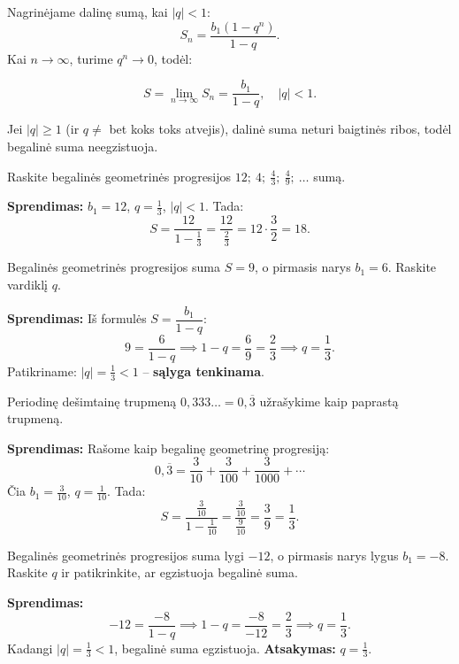 Nagrinėjame dalinę sumą, kai $|q| < 1$:
\[
    S_n = \frac{b_1(1 - q^n)}{1 - q}.
\]
Kai $n \to \infty$, turime $q^n \to 0$, todėl:

\begin{tcolorbox}[colback=orange!5!white, colframe=orange!70!black, title=Begalinės geometrinės progresijos suma]
\[
    S = \lim_{n \to \infty} S_n = \frac{b_1}{1 - q}, \quad |q| < 1.
\]
\end{tcolorbox}

\begin{remark}
Jei $|q| \geq 1$ (ir $q \neq $ bet koks toks atvejis), dalinė suma neturi baigtinės ribos, todėl begalinė suma neegzistuoja.
\end{remark}

\begin{example}
Raskite begalinės geometrinės progresijos $12;\ 4;\ \tfrac{4}{3};\ \tfrac{4}{9};\ \ldots$ sumą.

\textbf{Sprendimas:} $b_1 = 12$, $q = \tfrac{1}{3}$, $|q| < 1$. Tada:
\[
    S = \frac{12}{1 - \tfrac{1}{3}} = \frac{12}{\tfrac{2}{3}} = 12 \cdot \frac{3}{2} = 18.
\]
\end{example}

\begin{example}
Begalinės geometrinės progresijos suma $S = 9$, o pirmasis narys $b_1 = 6$. Raskite vardiklį $q$.

\textbf{Sprendimas:} Iš formulės $S = \dfrac{b_1}{1-q}$:
\[
    9 = \frac{6}{1 - q} \implies 1 - q = \frac{6}{9} = \frac{2}{3} \implies q = \frac{1}{3}.
\]
Patikriname: $|q| = \tfrac{1}{3} < 1$ – \textbf{sąlyga tenkinama}.
\end{example}

\begin{example}
Periodinę dešimtainę trupmeną $0{,}333\ldots = 0{,}\overline{3}$ užrašykime kaip paprastą trupmeną.

\textbf{Sprendimas:} Rašome kaip begalinę geometrinę progresiją:
\[
    0{,}\overline{3} = \frac{3}{10} + \frac{3}{100} + \frac{3}{1000} + \cdots
\]
Čia $b_1 = \tfrac{3}{10}$, $q = \tfrac{1}{10}$. Tada:
\[
    S = \frac{\tfrac{3}{10}}{1 - \tfrac{1}{10}} = \frac{\tfrac{3}{10}}{\tfrac{9}{10}} = \frac{3}{9} = \frac{1}{3}.
\]
\end{example}

\begin{exercise}
Begalinės geometrinės progresijos suma lygi $-12$, o pirmasis narys lygus $b_1 = -8$. Raskite $q$ ir patikrinkite, ar egzistuoja begalinė suma.

\textbf{Sprendimas:}
\[
    -12 = \frac{-8}{1 - q} \implies 1 - q = \frac{-8}{-12} = \frac{2}{3} \implies q = \frac{1}{3}.
\]
Kadangi $|q| = \tfrac{1}{3} < 1$, begalinė suma egzistuoja. \textbf{Atsakymas:} $q = \tfrac{1}{3}$.
\end{exercise}

